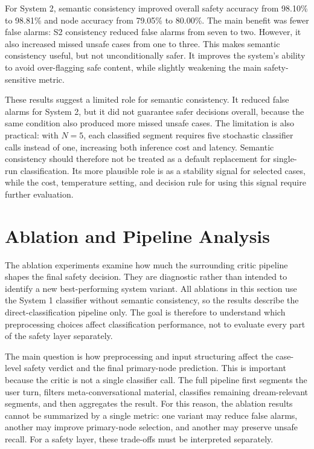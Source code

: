 For System 2, semantic consistency improved overall safety accuracy from 98.10\% to 98.81\% and node accuracy from 79.05\% to 80.00\%. The main benefit was fewer false alarms: S2 consistency reduced false alarms from seven to two. However, it also increased missed unsafe cases from one to three. This makes semantic consistency useful, but not unconditionally safer. It improves the system's ability to avoid over-flagging safe content, while slightly weakening the main safety-sensitive metric.

These results suggest a limited role for semantic consistency. It reduced false alarms for System 2, but it did not guarantee safer decisions overall, because the same condition also produced more missed unsafe cases. The limitation is also practical: with \(N=5\), each classified segment requires five stochastic classifier calls instead of one, increasing both inference cost and latency. Semantic consistency should therefore not be treated as a default replacement for single-run classification. Its more plausible role is as a stability signal for selected cases, while the cost, temperature setting, and decision rule for using this signal require further evaluation.

\section{Ablation and Pipeline Analysis}

The ablation experiments examine how much the surrounding critic pipeline shapes the
final safety decision. They are diagnostic rather than intended to identify a new
best-performing system variant. All ablations in this section use the System 1 classifier
without semantic consistency, so the results describe the direct-classification pipeline
only. The goal is therefore to understand which preprocessing choices affect classification
performance, not to evaluate every part of the safety layer separately.

The main question is how preprocessing and input structuring affect the case-level
safety verdict and the final primary-node prediction. This is important because the
critic is not a single classifier call. The full pipeline first segments the user turn,
filters meta-conversational material, classifies remaining dream-relevant segments, and
then aggregates the result. For this reason, the ablation results cannot be summarized
by a single metric: one variant may reduce false alarms, another may improve
primary-node selection, and another may preserve unsafe recall. For a safety layer,
these trade-offs must be interpreted separately.

